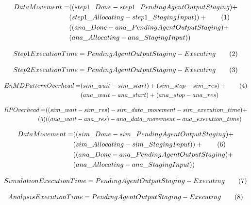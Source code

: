 \documentclass[]{article}
\newcommand\numberthis{\addtocounter{equation}{1}\tag{\theequation}}
\begin{document}
		\begin{align*}
			Data Movement = &((step1\_Done - step1\_PendingAgentOutputStaging) + \\
							&(step1\_Allocating - step1\_StagingInput)) + \numberthis \label{4} \\
							&((ana\_Done - ana\_PendingAgentOutputStaging) + \\
							&(ana\_Allocating - ana\_StagingInput)) 
		\end{align*}
		
		\begin{align*}
			Step 1 Execution Time = PendingAgentOutputStaging - Executing \numberthis \label{5}
		\end{align*}

		\begin{align*}
			Step 2 Execution Time = PendingAgentOutputStaging - Executing \numberthis \label{6}
		\end{align*}

		\begin{align*}
			EnMD Pattern Overhead = &(sim\_wait-sim\_start) + (sim\_stop - sim\_res) + \numberthis \label{7} \\
									&(ana\_wait-ana\_start) + (ana\_stop - ana\_res) 
		\end{align*}

		\begin{align*}
			RP Overhead = &((sim\_wait - sim\_res) - sim\_data\_movement - sim\_execution\_time) + \\ \numberthis \label{8} 
						  &((ana\_wait - ana\_res) - ana\_data\_movement - ana\_execution\_time) 
		\end{align*}

		\begin{align*}
			Data Movement = &((sim\_Done - sim\_PendingAgentOutputStaging) + \\
							&(sim\_Allocating - sim\_StagingInput)) + \numberthis \label{9} \\
							&((ana\_Done - ana\_PendingAgentOutputStaging) + \\
							&(ana\_Allocating - ana\_StagingInput)) 
		\end{align*}
		
		\begin{align*}
			Simulation Execution Time = PendingAgentOutputStaging - Executing \numberthis \label{10}
		\end{align*}

		\begin{align*}
			Analysis Execution Time = PendingAgentOutputStaging - Executing \numberthis \label{11}
		\end{align*}
\end{document}
